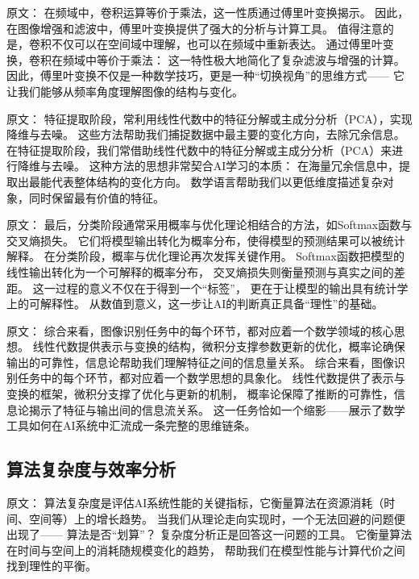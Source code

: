 原文：
在频域中，卷积运算等价于乘法，这一性质通过傅里叶变换揭示。  
因此，在图像增强和滤波中，傅里叶变换提供了强大的分析与计算工具。
值得注意的是，卷积不仅可以在空间域中理解，也可以在频域中重新表达。  
通过傅里叶变换，卷积在频域中等价于乘法：  
这一特性极大地简化了复杂滤波与增强的计算。  
因此，傅里叶变换不仅是一种数学技巧，更是一种“切换视角”的思维方式——  
它让我们能够从频率角度理解图像的结构与变化。



原文：
特征提取阶段，常利用线性代数中的特征分解或主成分分析（PCA），实现降维与去噪。  
这些方法帮助我们捕捉数据中最主要的变化方向，去除冗余信息。
在特征提取阶段，我们常借助线性代数中的特征分解或主成分分析（PCA）来进行降维与去噪。  
这种方法的思想非常契合AI学习的本质：  
在海量冗余信息中，提取出最能代表整体结构的变化方向。  
数学语言帮助我们以更低维度描述复杂对象，同时保留最有价值的特征。



原文：
最后，分类阶段通常采用概率与优化理论相结合的方法，如Softmax函数与交叉熵损失。  
它们将模型输出转化为概率分布，使得模型的预测结果可以被统计解释。
在分类阶段，概率与优化理论再次发挥关键作用。  
Softmax函数把模型的线性输出转化为一个可解释的概率分布，  
交叉熵损失则衡量预测与真实之间的差距。  
这一过程的意义不仅在于得到一个“标签”，  
更在于让模型的输出具有统计学上的可解释性。  
从数值到意义，这一步让AI的判断真正具备“理性”的基础。



原文：
综合来看，图像识别任务中的每个环节，都对应着一个数学领域的核心思想。  
线性代数提供表示与变换的结构，微积分支撑参数更新的优化，概率论确保输出的可靠性，信息论帮助我们理解特征之间的信息量关系。  
综合来看，图像识别任务中的每个环节，都对应着一个数学思想的具象化。  
线性代数提供了表示与变换的框架，微积分支撑了优化与更新的机制，  
概率论保障了推断的可靠性，信息论揭示了特征与输出间的信息流关系。  
这一任务恰如一个缩影——展示了数学工具如何在AI系统中汇流成一条完整的思维链条。



\subsection{算法复杂度与效率分析}

原文：
算法复杂度是评估AI系统性能的关键指标，它衡量算法在资源消耗（时间、空间等）上的增长趋势。
当我们从理论走向实现时，一个无法回避的问题便出现了——  
算法是否“划算”？  
复杂度分析正是回答这一问题的工具。  
它衡量算法在时间与空间上的消耗随规模变化的趋势，  
帮助我们在模型性能与计算代价之间找到理性的平衡。



